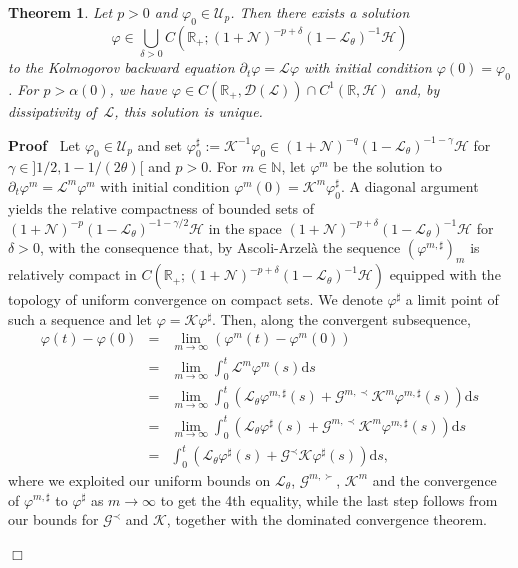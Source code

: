 \documentclass{article}
\newcommand{\assign}{:=}
\newcommand{\mathd}{\mathrm{d}}
\newenvironment{proof}{\noindent\textbf{Proof\ }}{\hspace*{\fill}$\Box$\medskip}
\newtheorem{theorem}{Theorem}
\begin{document}
\begin{theorem}
  \label{thm:exist-kolmogorov}Let $p > 0$ and $\varphi_0 \in \mathcal{U}_p$.
  Then there exists a solution
  \[ \varphi \in \bigcup_{\delta > 0} C (\mathbb{R}_+ ; (1 +\mathcal{N})^{- p
     + \delta} (1 -\mathcal{L}_{\theta})^{- 1} \mathcal{H}) \]
  to the Kolmogorov backward equation $\partial_t \varphi =\mathcal{L}
  \varphi$ with initial condition $\varphi (0) = \varphi_0$. For $p > \alpha
  (0)$, we have $\varphi \in C (\mathbb{R}_+, \mathcal{D} (\mathcal{L})) \cap
  C^1 (\mathbb{R}, \mathcal{H})$ and, by dissipativity of~$\mathcal{L}$, this
  solution is unique.
\end{theorem}

\begin{proof}
  Let $\varphi_0 \in \mathcal{U}_p$ and set $\varphi_0^{\sharp} \assign
  \mathcal{K}^{- 1} \varphi_0 \in (1 +\mathcal{N})^{- q} (1
  -\mathcal{L}_{\theta})^{- 1 - \gamma} \mathcal{H}$ for $\gamma \in] 1 / 2, 1
  - 1 / (2 \theta) [$ and $p > 0$. For $m \in \mathbb{N}$, let $\varphi^m$ be
  the solution to $\partial_t \varphi^m =\mathcal{L}^m \varphi^m$ with initial
  condition $\varphi^m (0) =\mathcal{K}^m \varphi_0^{\sharp}$. A diagonal
  argument yields the relative compactness of bounded sets of $(1
  +\mathcal{N})^{- p} (1 -\mathcal{L}_{\theta})^{- 1 - \gamma / 2}
  \mathcal{H}$ in the space $(1 +\mathcal{N})^{- p + \delta} (1
  -\mathcal{L}_{\theta})^{- 1} \mathcal{H}$ for $\delta > 0$, with the
  consequence that, by Ascoli-Arzel{\`a} the sequence $(\varphi^{m,
  \sharp})_m$ is relatively compact in $C (\mathbb{R}_+ ; (1 +\mathcal{N})^{-
  p + \delta} (1 -\mathcal{L}_{\theta})^{- 1} \mathcal{H})$ equipped with the
  topology of uniform convergence on compact sets. We denote
  $\varphi^{\sharp}$ a limit point of such a sequence and let $\varphi
  =\mathcal{K} \varphi^{\sharp}$. Then, along the convergent subsequence,
  \begin{eqnarray*}
    \varphi (t) - \varphi (0) & = & \lim_{m \rightarrow \infty} (\varphi^m (t)
    - \varphi^m (0))\\
    & = & \lim_{m \rightarrow \infty} \int_0^t \mathcal{L}^m \varphi^m (s)
    \mathd s\\
    & = & \lim_{m \rightarrow \infty} \int_0^t (\mathcal{L}_{\theta}
    \varphi^{m, \sharp} (s) +\mathcal{G}^{m, \prec} \mathcal{K}^m \varphi^{m,
    \sharp} (s)) \mathd s\\
    & = & \lim_{m \rightarrow \infty} \int_0^t (\mathcal{L}_{\theta}
    \varphi^{\sharp} (s) +\mathcal{G}^{m, \prec} \mathcal{K}^m \varphi^{m,
    \sharp} (s)) \mathd s\\
    & = & \int_0^t (\mathcal{L}_{\theta} \varphi^{\sharp} (s)
    +\mathcal{G}^{\prec} \mathcal{K} \varphi^{\sharp} (s)) \mathd s,
  \end{eqnarray*}
  where we exploited our uniform bounds on $\mathcal{L}_{\theta}$,
  $\mathcal{G}^{m, \succ}$, $\mathcal{K}^m$ and the convergence of
  $\varphi^{m, \sharp}$ to $\varphi^{\sharp}$ as $m \rightarrow \infty$ to get
  the 4th equality, while the last step follows from our bounds for
  $\mathcal{G}^{\prec}$ and $\mathcal{K}$, together with the dominated
  convergence theorem.
  

\end{proof}
\end{document}
